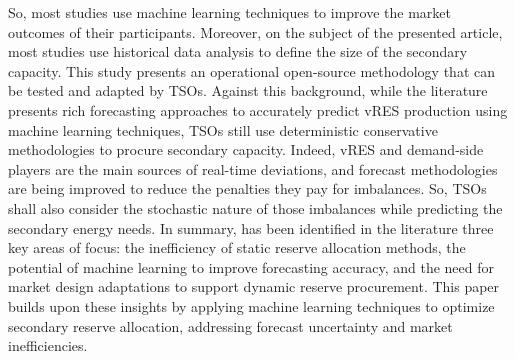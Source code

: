 \textcolor[rgb]{0,0.25,0.25}{So, most studies use machine learning techniques to improve the market outcomes of their participants. Moreover, on the subject of the presented article, most studies use historical data analysis to define the size of the secondary capacity. This study presents an operational open-source methodology that can be tested and adapted by TSOs. 
Against this background, while the literature presents rich forecasting approaches to accurately predict vRES production using machine learning techniques, TSOs still use deterministic conservative methodologies to procure secondary capacity. Indeed, vRES and demand-side players are the main sources of real-time deviations, and forecast methodologies are being improved to reduce the penalties they pay for imbalances.  So, TSOs shall also consider the stochastic nature of those imbalances while predicting the secondary energy needs.}
In summary, has been identified in the literature three key areas of focus: the inefficiency of static reserve allocation methods, the potential of machine learning to improve forecasting accuracy, and the need for market design adaptations to support dynamic reserve procurement. This paper builds upon these insights by applying machine learning techniques to optimize secondary reserve allocation, addressing forecast uncertainty and market inefficiencies.\par